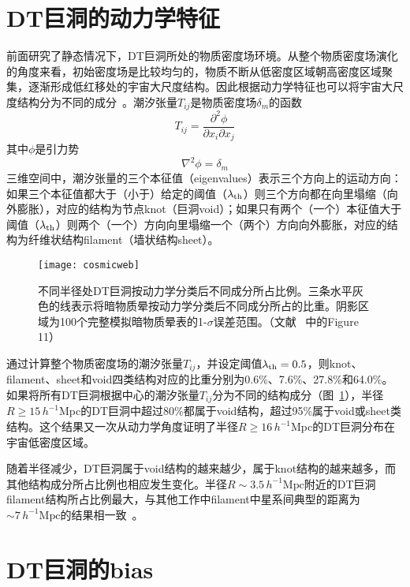 \section{DT巨洞的动力学特征}

前面研究了静态情况下，DT巨洞所处的物质密度场环境。从整个物质密度场演化的角度来看，初始密度场是比较均匀的，物质不断从低密度区域朝高密度区域聚集，逐渐形成低红移处的宇宙大尺度结构。因此根据动力学特征也可以将宇宙大尺度结构分为不同的成分~\cite{Hahn2007,Forero-Romero2009}。潮汐张量$T_{i j}$是物质密度场$\delta_m$的函数
\begin{equation}
T_{i j} = \frac{\partial^2 \phi}{\partial x_i \partial x_j} 
\end{equation}
其中$\phi$是引力势
\begin{equation}
\nabla^2 \phi = \delta_m 
\end{equation}
三维空间中，潮汐张量的三个本征值（eigenvalues）表示三个方向上的运动方向：如果三个本征值都大于（小于）给定的阈值（$\lambda_{\rm th}$）则三个方向都在向里塌缩（向外膨胀），对应的结构为节点knot（巨洞void）；如果只有两个（一个）本征值大于阈值（$\lambda_{\rm th}$）则两个（一个）方向向里塌缩一个（两个）方向向外膨胀，对应的结构为纤维状结构filament（墙状结构sheet）。

\begin{figure}
\centering
\texttt{[image: cosmicweb]}
\caption{不同半径处DT巨洞按动力学分类后不同成分所占比例。三条水平灰色的线表示将暗物质晕按动力学分类后不同成分所占的比重。阴影区域为100个完整模拟暗物质晕表的1-$\sigma$误差范围。（文献 ~中的Figure 11）}
\label{fig:cosweb}
\end{figure}

通过计算整个物质密度场的潮汐张量$T_{i j}$，并设定阈值$\lambda_{\rm th} = 0.5$，则knot、filament、sheet和void四类结构对应的比重分别为0.6\%、7.6\%、27.8\%和64.0\%。如果将所有DT巨洞根据中心的潮汐张量$T_{i j}$分为不同的结构成分（图~\ref{fig:cosweb}），半径$R \geq 15\,h^{-1}$Mpc的DT巨洞中超过80\%都属于void结构，超过95\%属于void或sheet类结构。这个结果又一次从动力学角度证明了半径$R \geq 16\,h^{-1}$Mpc的DT巨洞分布在宇宙低密度区域。

随着半径减少，DT巨洞属于void结构的越来越少，属于knot结构的越来越多，而其他结构成分所占比例也相应发生变化。半径$R \sim 3.5\,h^{-1}\mathrm{Mpc}$附近的DT巨洞filament结构所占比例最大，与其他工作中filament中星系间典型的距离为$\sim 7\,h^{-1}\mathrm{Mpc}$的结果相一致~\cite{Tempel2014}。

\section{DT巨洞的bias}

